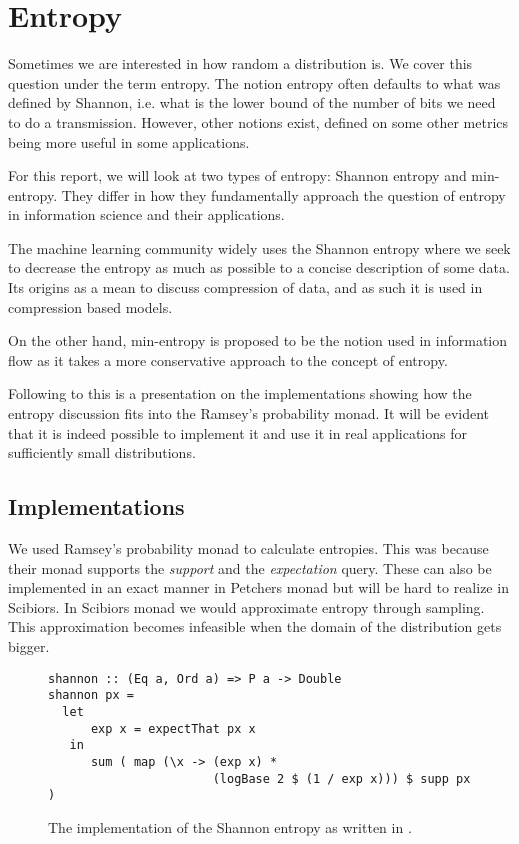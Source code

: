 \section{Entropy}
Sometimes we are interested in how random a distribution is. We
cover this question under the term entropy. The notion entropy often defaults
to what was defined by Shannon, i.e. what is the lower bound of
the number of bits we need to do a transmission. However, other notions exist,
defined on some other metrics being more useful in some applications.

For this report, we will look at two types of entropy: Shannon entropy and
min-entropy. They differ in how they fundamentally approach the question
of entropy in information science and their applications.

The machine learning community widely uses the Shannon entropy
where we seek to decrease the entropy as much as possible to a concise
description of some data. Its origins as a mean to discuss compression
of data, and as such it is used in compression based models.

On the other hand, min-entropy is proposed to be the notion used in
information flow as it takes a more conservative approach to the
concept of entropy.

Following to this is a presentation on the implementations showing
how the entropy discussion fits into the Ramsey's probability monad.
It will be evident that it is indeed possible to implement it and
use it in real applications for sufficiently small distributions.

\subsection{Implementations}
We used Ramsey's probability monad to calculate entropies.
This was because their monad supports the \emph{support}
and the \emph{expectation} query. These can also be implemented in
an exact manner in Petchers monad but will be hard to realize in
Scibiors. In Scibiors monad we would approximate entropy
through sampling. This approximation becomes infeasible
when the domain of the distribution gets bigger.


\begin{figure}[H]
\begin{verbatim}
shannon :: (Eq a, Ord a) => P a -> Double
shannon px = 
  let
      exp x = expectThat px x
   in
      sum ( map (\x -> (exp x) * 
                       (logBase 2 $ (1 / exp x))) $ supp px )
\end{verbatim}
\caption{The implementation of the Shannon entropy as written in \cite{Smith:2009}.}
\label{code:shannon}
\end{figure}

